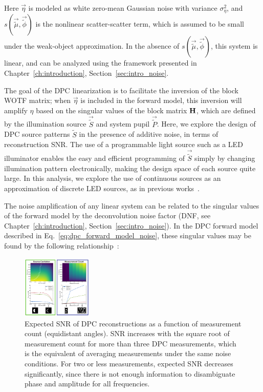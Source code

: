 \noindent Here $\vec{\eta}$ is modeled as white zero-mean Gaussian noise with variance $\sigma_{\eta}^2$, and $s(\vec{\tilde{\mu}}, \vec{\tilde{\phi}})$ is the nonlinear scatter-scatter term, which is assumed to be small under the weak-object approximation. In the absence of $s(\vec{\tilde{\mu}}, \vec{\tilde{\phi}})$, this system is linear, and can be analyzed using the framework presented in Chapter~\ref{ch:introduction}, Section~\ref{sec:intro_noise}.

The goal of the DPC linearization is to facilitate the inversion of the block WOTF matrix; when $\vec{\eta}$ is included in the forward model, this inversion will amplify $\eta$ based on the singular values of the block matrix $\mathbf{H}$, which are defined by the illumination source $\vec{\tilde{S}}$ and system pupil $\vec{\tilde{P}}$. Here, we explore the design of DPC source patterns $\tilde{S}$ in the presence of additive noise, in terms of reconstruction SNR. The use of a programmable light source such as a LED illuminator enables the easy and efficient programming of $\vec{\tilde{S}}$ simply by changing illumination pattern electronically, making the design space of each source quite large. In this analysis, we explore the use of continuous sources as an approximation of discrete LED sources, as in previous works~\cite{tian2015quantitative, Phillips:17}.


The noise amplification of any linear system can be related to the singular values of the forward model by the deconvolution noise factor (DNF, see Chapter~\ref{ch:introduction}, Section~\ref{sec:intro_noise}). In the DPC forward model described in Eq.~\ref{eq:dpc_forward_model_noise}, these singular values may be found by the following relationship~\cite{silvester2000determinants}:

\begin{figure}
  \label{fig:phase:dpc_measurement_count}
  \begin{center}
    \includegraphics[width=0.3\textwidth]{figures/fig_phase_dpc_optimization_meas.pdf}
  \end{center}
  \caption{Expected SNR of DPC reconstructions as a function of measurement count (equidistant angles). SNR increases with the square root of measurement count for more than three DPC measurements, which is the equivalent of averaging measurements under the same noise conditions. For two or less measurements, expected SNR decreases significantly, since there is not enough information to disambiguate phase and amplitude for all frequencies.}
\end{figure}

